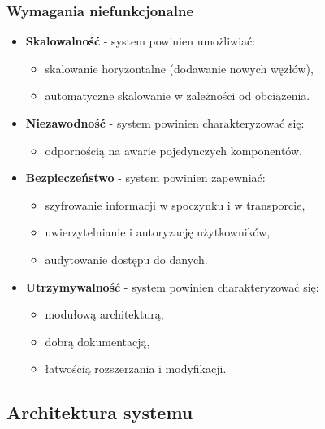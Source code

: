 \newpage

\subsubsection{Wymagania niefunkcjonalne}
\label{subsubsec:wymagania_niefunkcjonalne}

\begin{itemize}
    \setlength\itemsep{0.5em}
    \item \textbf{Skalowalność} - system powinien umożliwiać:
    \begin{itemize}
        \item skalowanie horyzontalne (dodawanie nowych węzłów),
        \item automatyczne skalowanie w zależności od obciążenia.
    \end{itemize}
    
    \item \textbf{Niezawodność} - system powinien charakteryzować się:
    \begin{itemize}
        \item odpornością na awarie pojedynczych komponentów.
    \end{itemize}
    
    \item \textbf{Bezpieczeństwo} - system powinien zapewniać:
    \begin{itemize}
        \item szyfrowanie informacji w spoczynku i w transporcie,
        \item uwierzytelnianie i autoryzację użytkowników,
        \item audytowanie dostępu do danych.
    \end{itemize}
    
    \item \textbf{Utrzymywalność} - system powinien charakteryzować się:
    \begin{itemize}
        \item modułową architekturą,
        \item dobrą dokumentacją,
        \item łatwością rozszerzania i modyfikacji.
    \end{itemize}
\end{itemize}

\newpage

\subsection{Architektura systemu}
\label{subsec:architektura}

